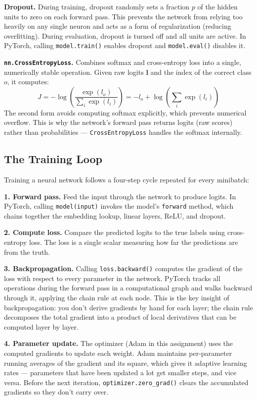 \documentclass[11pt]{article}
\begin{document}
\textbf{Dropout.} During training, dropout randomly sets a fraction $p$ of the hidden units to zero on each forward pass. This prevents the network from relying too heavily on any single neuron and acts as a form of regularization (reducing overfitting). During evaluation, dropout is turned off and all units are active. In PyTorch, calling \texttt{model.train()} enables dropout and \texttt{model.eval()} disables it.

\textbf{\texttt{nn.CrossEntropyLoss}.} Combines softmax and cross-entropy loss into a single, numerically stable operation. Given raw logits $\mathbf{l}$ and the index of the correct class $o$, it computes:
\[
J = -\log\!\left(\frac{\exp(l_o)}{\sum_i \exp(l_i)}\right) = -l_o + \log\!\left(\sum_i \exp(l_i)\right)
\]
The second form avoids computing softmax explicitly, which prevents numerical overflow. This is why the network's forward pass returns logits (raw scores) rather than probabilities --- \texttt{CrossEntropyLoss} handles the softmax internally.

\subsection{The Training Loop}

Training a neural network follows a four-step cycle repeated for every minibatch:

\textbf{1. Forward pass.} Feed the input through the network to produce logits. In PyTorch, calling \texttt{model(input)} invokes the model's \texttt{forward} method, which chains together the embedding lookup, linear layers, ReLU, and dropout.

\textbf{2. Compute loss.} Compare the predicted logits to the true labels using cross-entropy loss. The loss is a single scalar measuring how far the predictions are from the truth.

\textbf{3. Backpropagation.} Calling \texttt{loss.backward()} computes the gradient of the loss with respect to every parameter in the network. PyTorch tracks all operations during the forward pass in a computational graph and walks backward through it, applying the chain rule at each node. This is the key insight of backpropagation: you don't derive gradients by hand for each layer; the chain rule decomposes the total gradient into a product of local derivatives that can be computed layer by layer.

\textbf{4. Parameter update.} The optimizer (Adam in this assignment) uses the computed gradients to update each weight. Adam maintains per-parameter running averages of the gradient and its square, which gives it adaptive learning rates --- parameters that have been updated a lot get smaller steps, and vice versa. Before the next iteration, \texttt{optimizer.zero\_grad()} clears the accumulated gradients so they don't carry over.
\end{document}
